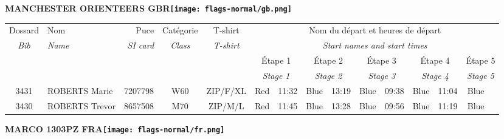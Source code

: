 \documentclass{report}
\begin{document}
\newpage
  \Huge \centering \bfseries MANCHESTER ORIENTEERS  GBR\normalfont \footnotesize \sffamily \hfill \texttt{[image: flags-normal/gb.png]} \newline 
  \begin{longtable}{|c|l|r|c|c|*{5}{cc|}}
    Dossard & Nom  & Puce    & Catégorie & T-shirt & \multicolumn{10}{c|}{Nom du départ et heures de départ} \\
    \itshape Bib     & \itshape Name & \itshape SI card & \itshape Class  & \itshape  T-shirt  & \multicolumn{10}{c|}{\itshape Start names and start times} \\
    \hline
    & & & & & \multicolumn{2}{c|}{Étape 1} & \multicolumn{2}{c|}{Étape 2} & \multicolumn{2}{c|}{Étape 3} & \multicolumn{2}{c|}{Étape 4} & \multicolumn{2}{c|}{Étape 5} \\
    & & & & & \multicolumn{2}{c|}{\itshape Stage 1} & \multicolumn{2}{c|}{\itshape Stage 2} & \multicolumn{2}{c|}{\itshape Stage 3} & \multicolumn{2}{c|}{\itshape Stage 4} & \multicolumn{2}{c|}{\itshape Stage 5} \\
    \hline
    3431 & ROBERTS Marie & 7207798 & W60 & ZIP/F/XL & Red & 11:32 & Blue & 13:19 & Blue & 09:38 & Blue & 11:04 & Blue &  \\
    3430 & ROBERTS Trevor & 8657508 & M70 & ZIP/M/L & Red & 11:45 & Blue & 13:28 & Blue & 09:56 & Blue & 11:19 & Blue &  \\
  \end{longtable}
\newpage
  \Huge \centering \bfseries MARCO 1303PZ FRA\normalfont \footnotesize \sffamily \hfill \texttt{[image: flags-normal/fr.png]} \newline 
\end{document}
